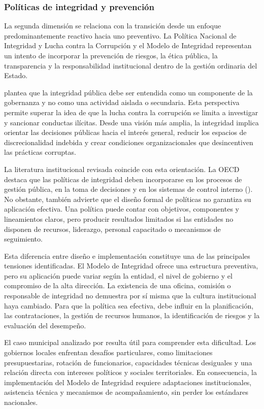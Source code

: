 \documentclass[Afour,sageh,times]{sagej}
\begin{document}
\subsubsection{Políticas de integridad y prevención}

La segunda dimensión se relaciona con la transición desde un enfoque predominantemente reactivo hacia uno preventivo. La Política Nacional de Integridad y Lucha contra la Corrupción y el Modelo de Integridad representan un intento de incorporar la prevención de riesgos, la ética pública, la transparencia y la responsabilidad institucional dentro de la gestión ordinaria del Estado.

\citet{penamancillas2022integridad} plantea que la integridad pública debe ser entendida como un componente de la gobernanza y no como una actividad aislada o secundaria. Esta perspectiva permite superar la idea de que la lucha contra la corrupción se limita a investigar y sancionar conductas ilícitas. Desde una visión más amplia, la integridad implica orientar las decisiones públicas hacia el interés general, reducir los espacios de discrecionalidad indebida y crear condiciones organizacionales que desincentiven las prácticas corruptas.

La literatura institucional revisada coincide con esta orientación. La OECD destaca que las políticas de integridad deben incorporarse en los procesos de gestión pública, en la toma de decisiones y en los sistemas de control interno (\citealp{oecd2017integrity}). No obstante, también advierte que el diseño formal de políticas no garantiza su aplicación efectiva. Una política puede contar con objetivos, componentes y lineamientos claros, pero producir resultados limitados si las entidades no disponen de recursos, liderazgo, personal capacitado o mecanismos de seguimiento.

Esta diferencia entre diseño e implementación constituye una de las principales tensiones identificadas. El Modelo de Integridad ofrece una estructura preventiva, pero su aplicación puede variar según la entidad, el nivel de gobierno y el compromiso de la alta dirección. La existencia de una oficina, comisión o responsable de integridad no demuestra por sí misma que la cultura institucional haya cambiado. Para que la política sea efectiva, debe influir en la planificación, las contrataciones, la gestión de recursos humanos, la identificación de riesgos y la evaluación del desempeño.

El caso municipal analizado por \citet{integridadmunicipal2025} resulta útil para comprender esta dificultad. Los gobiernos locales enfrentan desafíos particulares, como limitaciones presupuestarias, rotación de funcionarios, capacidades técnicas desiguales y una relación directa con intereses políticos y sociales territoriales. En consecuencia, la implementación del Modelo de Integridad requiere adaptaciones institucionales, asistencia técnica y mecanismos de acompañamiento, sin perder los estándares nacionales.
\end{document}
